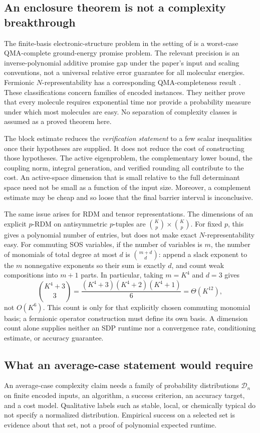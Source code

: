 \documentclass[11pt,a4paper]{article}
\theoremstyle{plain}
\theoremstyle{definition}
\theoremstyle{remark}
\begin{document}
\subsection{An enclosure theorem is not a complexity breakthrough}
The finite-basis electronic-structure problem in the setting of
\citet{OGorman2022} is a worst-case QMA-complete ground-energy promise
problem. The relevant precision is an inverse-polynomial additive promise
gap under the paper's input and scaling conventions, not a universal relative
error guarantee for all molecular energies. Fermionic $N$-representability
has a corresponding QMA-completeness result \citep{Liu2007}.
These classifications concern families of encoded instances. They neither
prove that every molecule requires exponential time nor provide a probability
measure under which most molecules are easy. No separation of complexity
classes is assumed as a proved theorem here.

The block estimate reduces the \emph{verification statement} to a few scalar
inequalities once their hypotheses are supplied. It does not reduce the cost
of constructing those hypotheses. The active eigenproblem, the complementary
lower bound, the coupling norm, integral generation, and verified rounding all
contribute to the cost. An active-space dimension that is small relative to
the full determinant space need not be small as a function of the input size.
Moreover, a complement estimate may be cheap and so loose that the final
barrier interval is inconclusive.

The same issue arises for RDM and tensor representations. The dimensions of
an explicit $p$-RDM on antisymmetric $p$-tuples are
$\binom Kp\times\binom Kp$. For fixed $p$, this gives a polynomial
number of entries, but does not make exact $N$-representability easy. For
commuting SOS variables, if the number of variables is $m$, the number of
monomials of total degree at most $d$ is $\binom{m+d}{d}$: append a slack
exponent to the $m$ nonnegative exponents so their sum is exactly $d$, and
count weak compositions into $m+1$ parts. In particular, taking $m=K^4$
and $d=3$ gives
\[
 \binom{K^4+3}{3}
 =\frac{(K^4+3)(K^4+2)(K^4+1)}6=\Theta(K^{12}),
\]
not $O(K^6)$. This count is only for that explicitly chosen commuting
monomial basis; a fermionic operator construction must define its own basis.
A dimension count alone supplies neither an SDP runtime nor a convergence
rate, conditioning estimate, or accuracy guarantee.

\subsection{What an average-case statement would require}
An average-case complexity claim needs a family of probability distributions
$\mathcal D_n$ on finite encoded inputs, an algorithm, a success criterion,
an accuracy target, and a cost model. Qualitative labels such as stable,
local, or chemically typical do not specify a normalized distribution.
Empirical success on a selected set is evidence about that set, not a proof
of polynomial expected runtime.
\end{document}

